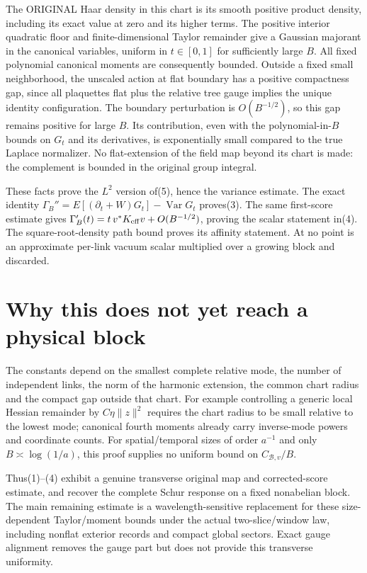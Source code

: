 \documentclass{article}
\begin{document}
The ORIGINAL Haar density in this chart is its smooth positive product density, including its exact value at zero and its higher terms. The positive interior quadratic floor and finite-dimensional Taylor remainder give a Gaussian majorant in the canonical variables, uniform in $t\in[0,1]$ for sufficiently large $B$. All fixed polynomial canonical moments are consequently bounded. Outside a fixed small neighborhood, the unscaled action at flat boundary has a positive compactness gap, since all plaquettes flat plus the relative tree gauge implies the unique identity configuration. The boundary perturbation is $O(B^{-1/2})$, so this gap remains positive for large $B$. Its contribution, even with the polynomial-in-$B$ bounds on $G_t$ and its derivatives, is exponentially small compared to the true Laplace normalizer. No flat-extension of the field map beyond its chart is made: the complement is bounded in the original group integral.

These facts prove the $L^2$ version of(5), hence the variance estimate. The exact identity
$\Gamma_B''=E[(\partial_t+W)G_t]-\operatorname{Var}G_t$ proves(3).
The same first-score estimate gives $\Gamma_B'(t)=t\,v^*K_{\rm eff}v+O(B^{-1/2})$, proving the scalar statement in(4). The square-root-density path bound proves its affinity statement. At no point is an approximate per-link vacuum scalar multiplied over a growing block and discarded.

\section*{Why this does not yet reach a physical block}
The constants depend on the smallest complete relative mode, the number of independent links, the norm of the harmonic extension, the common chart radius and the compact gap outside that chart. For example controlling a generic local Hessian remainder by $C\eta\|z\|^2$ requires the chart radius to be small relative to the lowest mode; canonical fourth moments already carry inverse-mode powers and coordinate counts. For spatial/temporal sizes of order $a^{-1}$ and only $B\asymp\log(1/a)$, this proof supplies no uniform bound on $C_{\mathcal B,v}/B$.

Thus(1)--(4) exhibit a genuine transverse original map and corrected-score estimate, and recover the complete Schur response on a fixed nonabelian block. The main remaining estimate is a wavelength-sensitive replacement for these size-dependent Taylor/moment bounds under the actual two-slice/window law, including nonflat exterior records and compact global sectors. Exact gauge alignment removes the gauge part but does not provide this transverse uniformity.
\end{document}
